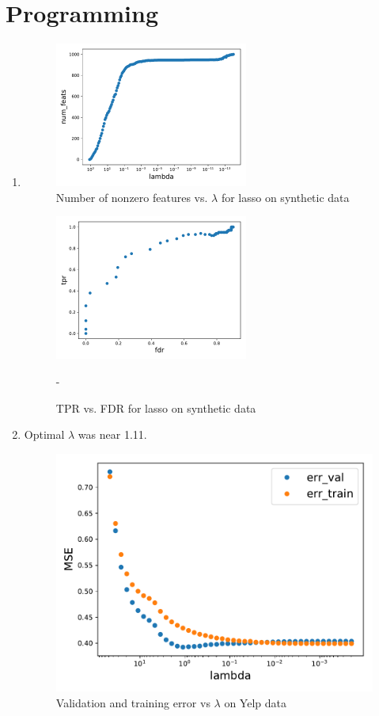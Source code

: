 \documentclass[11pt,letterpaper]{article}
\numberwithin{equation}{section}
\numberwithin{figure}{section}
\begin{document}
\section{Programming}
\begin{enumerate}
	\item 
		\begin{figure}[H]
			\centering
			\includegraphics[width=0.6\textwidth]{figures/synth_nfeats_80.pdf}
			\caption{Number of nonzero features vs. $\lambda$ for lasso on synthetic data}
		\end{figure}

		\begin{figure}[H]
			\centering
			\includegraphics[width=0.6\textwidth]{figures/synth_fdr-tpr_80.pdf}
			\caption{TPR vs. FDR for lasso on synthetic data}-
		\end{figure}











	\item
	    

	Optimal $\lambda$ was near 1.11.
		\begin{figure}[H]
			\centering
			\includegraphics[width=.6\textwidth]{figures/yelp_errs.pdf}
			\caption{Validation and training error vs $\lambda$ on Yelp data}
		\end{figure}


\end{enumerate}
\end{document}
